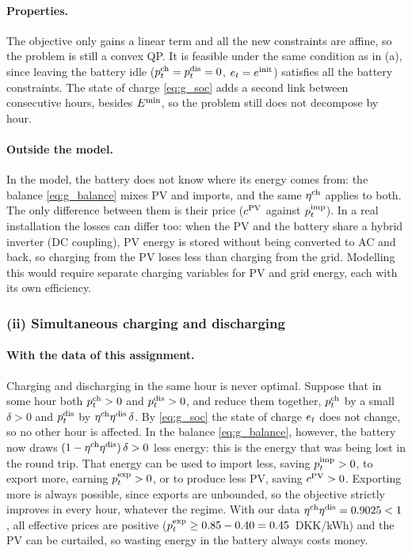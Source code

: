 \paragraph{Properties.}
The objective only gains a linear term and all the new constraints are affine, so the problem
is still a convex QP. It is feasible under the same condition as in (a), since leaving the
battery idle ($p^{\mathrm{ch}}_{t} = p^{\mathrm{dis}}_{t} = 0$, $e_{t} = e^{\mathrm{init}}$) satisfies all the battery constraints. The
state of charge \eqref{eq:g_soc} adds a second link between consecutive hours, besides $E^{\min}$,
so the problem still does not decompose by hour.

\paragraph{Outside the model.}
In the model, the battery does not know where its energy comes from: the balance
\eqref{eq:g_balance} mixes PV and imports, and the same $\eta^{\mathrm{ch}}$ applies to both. The only
difference between them is their price ($c^{\mathrm{PV}}$ against $p^{\mathrm{imp}}_{t}$). In a real installation the
losses can differ too: when the PV and the battery share a hybrid inverter (DC coupling), PV
energy is stored without being converted to AC and back, so charging from the PV loses less
than charging from the grid. Modelling this would require separate charging variables for PV
and grid energy, each with its own efficiency.

\subsubsection{(ii) Simultaneous charging and discharging}
\paragraph{With the data of this assignment.}
Charging and discharging in the same hour is never optimal. Suppose that in some hour both
$p^{\mathrm{ch}}_{t} > 0$ and $p^{\mathrm{dis}}_{t} > 0$, and reduce them together, $p^{\mathrm{ch}}_{t}$ by a small $\delta > 0$ and $p^{\mathrm{dis}}_{t}$ by
$\eta^{\mathrm{ch}} \eta^{\mathrm{dis}} \, \delta$. By \eqref{eq:g_soc} the state of charge $e_{t}$ does not change, so
no other hour is affected. In the balance \eqref{eq:g_balance}, however, the battery now
draws $(1 - \eta^{\mathrm{ch}} \eta^{\mathrm{dis}})\,\delta > 0$ less energy: this is the energy that was being lost
in the round trip. That energy can be used to import less, saving $p^{\mathrm{imp}}_{t} > 0$, to export
more, earning $p^{\mathrm{exp}}_{t} > 0$, or to produce less PV, saving $c^{\mathrm{PV}} > 0$. Exporting more is always
possible, since exports are unbounded, so the objective strictly improves in every hour,
whatever the regime. With our data $\eta^{\mathrm{ch}} \eta^{\mathrm{dis}} = 0.9025 < 1$, all effective prices are
positive ($p^{\mathrm{exp}}_{t} \geq 0.85 - 0.40 = 0.45$~DKK/kWh) and the PV can be curtailed, so wasting
energy in the battery always costs money.


